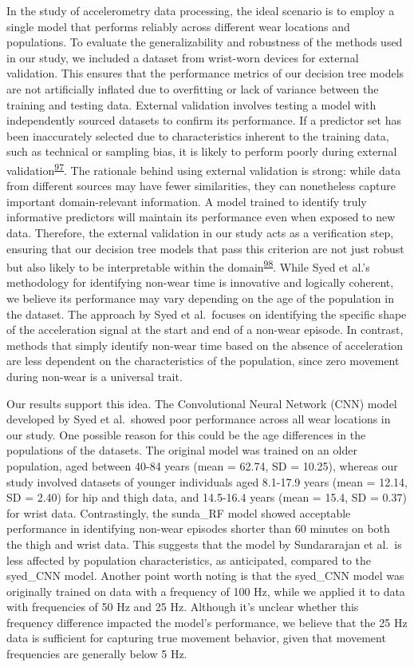 \documentclass[
  9pt,
]{scrbook}
\begin{document}
In the study of accelerometry data processing, the ideal scenario is to
employ a single model that performs reliably across different wear
locations and populations. To evaluate the generalizability and
robustness of the methods used in our study, we included a dataset from
wrist-worn devices for external validation. This ensures that the
performance metrics of our decision tree models are not artificially
inflated due to overfitting or lack of variance between the training and
testing data. External validation involves testing a model with
independently sourced datasets to confirm its performance. If a
predictor set has been inaccurately selected due to characteristics
inherent to the training data, such as technical or sampling bias, it is
likely to perform poorly during external
validation\textsuperscript{\protect\hyperlink{ref-steyerberg_prediction_2016}{97}}.
The rationale behind using external validation is strong: while data
from different sources may have fewer similarities, they can nonetheless
capture important domain-relevant information. A model trained to
identify truly informative predictors will maintain its performance even
when exposed to new data. Therefore, the external validation in our
study acts as a verification step, ensuring that our decision tree
models that pass this criterion are not just robust but also likely to
be interpretable within the
domain\textsuperscript{\protect\hyperlink{ref-altman_prognosis_2009}{98}}.
While Syed et al.'s methodology for identifying non-wear time is
innovative and logically coherent, we believe its performance may vary
depending on the age of the population in the dataset. The approach by
Syed et al.~focuses on identifying the specific shape of the
acceleration signal at the start and end of a non-wear episode. In
contrast, methods that simply identify non-wear time based on the
absence of acceleration are less dependent on the characteristics of the
population, since zero movement during non-wear is a universal trait.

Our results support this idea. The Convolutional Neural Network (CNN)
model developed by Syed et al.~showed poor performance across all wear
locations in our study. One possible reason for this could be the age
differences in the populations of the datasets. The original model was
trained on an older population, aged between 40-84 years (mean = 62.74,
SD = 10.25), whereas our study involved datasets of younger individuals
aged 8.1-17.9 years (mean = 12.14, SD = 2.40) for hip and thigh data,
and 14.5-16.4 years (mean = 15.4, SD = 0.37) for wrist data.
Contrastingly, the sunda\_RF model showed acceptable performance in
identifying non-wear episodes shorter than 60 minutes on both the thigh
and wrist data. This suggests that the model by Sundararajan et al.~is
less affected by population characteristics, as anticipated, compared to
the syed\_CNN model. Another point worth noting is that the syed\_CNN
model was originally trained on data with a frequency of 100 Hz, while
we applied it to data with frequencies of 50 Hz and 25 Hz. Although it's
unclear whether this frequency difference impacted the model's
performance, we believe that the 25 Hz data is sufficient for capturing
true movement behavior, given that movement frequencies are generally
below 5 Hz.
\end{document}
